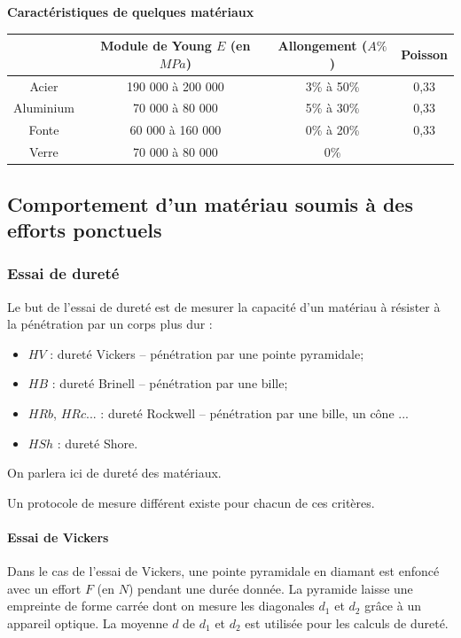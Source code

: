 \documentclass[11pt,oneside]{article}
\begin{document}
\begin{exemple}
\textbf{Caractéristiques de quelques matériaux}

\begin{center}
\begin{tabular}{|c|c|c|c|}
\cline{2-4}
\multicolumn{1}{c|}{}& Module de Young $E$ (en $MPa$) & Allongement ($A\%$) & Poisson \\
\cline{2-4}
\hline
Acier & 190 000 à 200 000 & 3\% à 50\% & 0,33 \\ \hline
Aluminium & 70 000 à 80 000 & 5\% à 30\% & 0,33 \\ \hline
Fonte  & 60 000 à 160 000 & 0\% à 20\% & 0,33 \\ \hline
Verre  & 70 000 à 80 000 & 0\% & \\ \hline
\end{tabular}
\end{center}

\end{exemple}

\subsection{Comportement d'un matériau soumis à des efforts ponctuels}
\subsubsection*{Essai de dureté}
\begin{obj}
Le but de l'essai de dureté est de mesurer la capacité d'un matériau à résister à la pénétration par un corps plus dur :
\begin{itemize}
\item $HV$ : dureté Vickers -- pénétration par une pointe pyramidale;
\item $HB$ : dureté Brinell -- pénétration par une bille;
\item $HRb$, $HRc$... : dureté Rockwell -- pénétration par une bille, un cône ...
\item $HSh$ : dureté Shore.
\end{itemize}

On parlera ici de dureté des matériaux. 

\end{obj}

Un protocole de mesure différent existe pour chacun de ces critères.

\paragraph*{Essai de Vickers}
Dans le cas de l'essai de Vickers, une pointe pyramidale en diamant est enfoncé avec un effort $F$ (en $N$) pendant une durée donnée. La pyramide laisse une empreinte de forme carrée dont on mesure les diagonales $d_1$ et $d_2$ grâce à un appareil optique. La moyenne $d$ de $d_1$ et $d_2$ est utilisée pour les calculs de dureté. 
\end{document}
